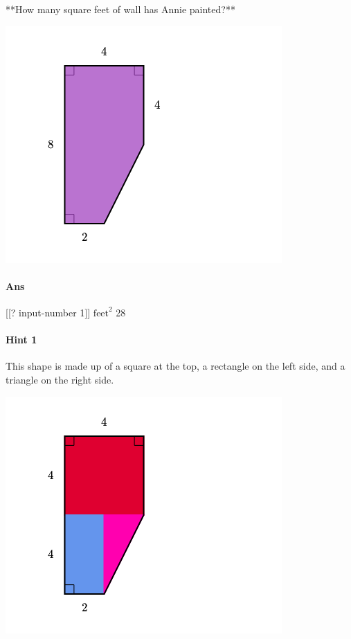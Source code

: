 \documentclass[twocolumn,10pt]{article}
\def\shrinkfactor{0.55}
\begin{document}
**How many square feet of wall has Annie painted?**  


\includegraphics[scale=\shrinkfactor]{figures/ed8d325b95059dd0c8803395e12520bc9ff14cd4.png}

\paragraph{Ans}  [[? input-number 1]] $\text{feet}^2$  28

\paragraph{Hint 1}This shape is made up of a square at the top, a rectangle on the left side, and a triangle on the right side.    


\includegraphics[scale=\shrinkfactor]{figures/b38c10de64f86ab72f10f002bed91ecdbb4d02ab.png}  
 
\end{document}
